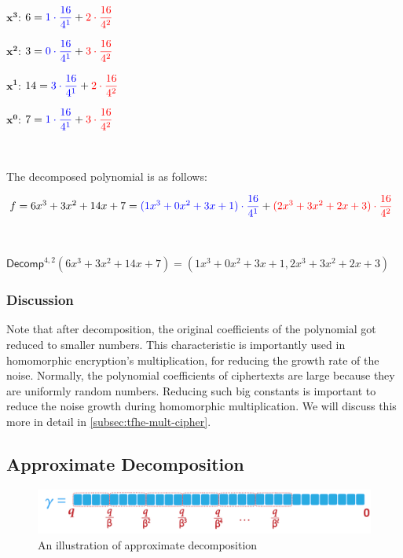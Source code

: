 ${\bm{x}^{\bm{3}}}$: $6 = \color{blue}{1 \cdot \dfrac{16}{4^1}} \color{black}+ \color{red}{2 \cdot \dfrac{16}{4^2}}$

${\bm{x}^{\bm{2}}}$: $3 = \color{blue}{0 \cdot \dfrac{16}{4^1}} \color{black}+ \color{red}{3 \cdot \dfrac{16}{4^2}}$

${\bm{x}^{\bm{1}}}$: $14 = \color{blue}{3 \cdot \dfrac{16}{4^1}} \color{black}+ \color{red}{2 \cdot \dfrac{16}{4^2}}$

${\bm{x}^{\bm{0}}}$: $7 = \color{blue}{1 \cdot \dfrac{16}{4^1}} \color{black}+ \color{red}{3 \cdot \dfrac{16}{4^2}}$

$ $

The decomposed polynomial is as follows:

$f = 6x^3 + 3x^2 + 14x + 7 = \color{blue}{(1x^3 + 0x^2 + 3x + 1) \cdot \dfrac{16}{4^1}} \color{black}+ \color{red}{(2x^3 + 3x^2 + 2x + 3) \cdot \dfrac{16}{4^2}} \color{black}$

$ $

$\textsf{Decomp}^{4, 2}(6x^3 + 3x^2 + 14x + 7) = (1x^3 + 0x^2 + 3x + 1, 2x^3 + 3x^2 + 2x + 3)$

\subsubsection{Discussion}

Note that after decomposition, the original coefficients of the polynomial got reduced to smaller numbers. This characteristic is importantly used in homomorphic encryption's multiplication, for reducing the growth rate of the noise. Normally, the polynomial coefficients of ciphertexts are large because they are uniformly random numbers. Reducing such big constants is important to reduce the noise growth during homomorphic multiplication. We will discuss this more in detail in \autoref{subsec:tfhe-mult-cipher}.


\subsection{Approximate Decomposition}
\label{subsec:approx-decomp}

\begin{figure}[h!]
    \centering
  \includegraphics[width=0.7\linewidth]{figures/decomp3.pdf}
  \caption{An illustration of approximate decomposition}
  \label{fig:decomp3}
\end{figure}


